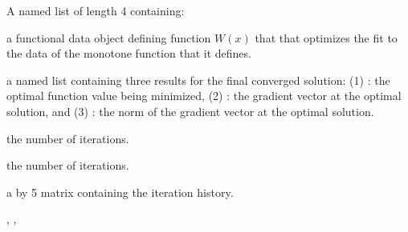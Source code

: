 \documentclass{article}
\begin{document}
\begin{Value}
A named list of length 4 containing:

\begin{ldescription}
\item[\code{Wfdobj}] a functional data object defining function $W(x)$ that that
optimizes the fit to the data of the monotone function that it defines.

\item[\code{Flist}] a named list containing three results for the final converged solution:
(1)
: the optimal function value being minimized,
(2)
: the gradient vector at the optimal solution,   and
(3)
: the norm of the gradient vector at the optimal solution.

\item[\code{iternum}] the number of iterations.

\item[\code{iternum}] the number of iterations.

\item[\code{iterhist}] a \code{} by 5 matrix containing the iteration
history.

\end{ldescription}
\end{Value}
\begin{SeeAlso}\relax
{}, 
, 
\end{SeeAlso}
\end{document}
